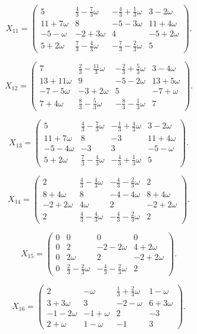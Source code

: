 \[ X_{11}=\begin{pmatrix}
5 & \frac{4}{3}-\frac{7}{3}\omega & -\frac{4}{3}+\frac{1}{3}\omega & 3-2\omega \\
11+7\omega & 8 & -5-3\omega & 11+4\omega \\
-5-\omega & -2+3\omega & 4 & -5+2\omega \\
5+2\omega & \frac{7}{3}-\frac{4}{3}\omega & -\frac{7}{3}-\frac{2}{3}\omega & 5
\end{pmatrix}.\]

\[ X_{12}=\begin{pmatrix}
7 & \frac{2}{3}-\frac{11}{3}\omega & -\frac{2}{3}+\frac{5}{3}\omega & 3-4\omega \\
13+11\omega & 9 & -5-2\omega & 13+5\omega \\
-7-5\omega & -3+2\omega & 5 & -7+\omega \\
7+4\omega & \frac{8}{3}-\frac{5}{3}\omega & -\frac{8}{3}-\frac{1}{3}\omega & 7
\end{pmatrix}.\]

\[ X_{13}=\begin{pmatrix}
5 & \frac{4}{3}-\frac{7}{3}\omega & -\frac{1}{3}+\frac{4}{3}\omega & 3-2\omega \\
11+7\omega & 8 & -3 & 11+4\omega \\
-5-4\omega & -3 & 3 & -5-\omega \\
5+2\omega & \frac{7}{3}-\frac{4}{3}\omega & -\frac{4}{3}+\frac{1}{3}\omega & 5
\end{pmatrix}.\]

\[ X_{14}=\begin{pmatrix}
2 & \frac{4}{3}-\frac{4}{3}\omega & -\frac{4}{3}-\frac{2}{3}\omega & 2 \\
8+4\omega & 8 & -4-4\omega & 8+4\omega \\
-2+2\omega & 4\omega & 2 & -2+2\omega \\
2 & \frac{4}{3}-\frac{4}{3}\omega & -\frac{4}{3}-\frac{2}{3}\omega & 2
\end{pmatrix}.\]

\[ X_{15}=\begin{pmatrix}
0 & 0 & 0 & 0 \\
0 & 2 & -2-2\omega & 4+2\omega \\
0 & 2\omega & 2 & -2+2\omega \\
0 & \frac{2}{3}-\frac{2}{3}\omega & -\frac{4}{3}-\frac{2}{3}\omega & 2
\end{pmatrix}.\]

\[ X_{16}=\begin{pmatrix}
2 & -\omega & \frac{1}{3}+\frac{2}{3}\omega & 1-\omega \\
3+3\omega & 3 & -2-\omega & 6+3\omega \\
-1-2\omega & -1+\omega & 2 & -3 \\
2+\omega & 1-\omega & -1 & 3
\end{pmatrix}.\]

